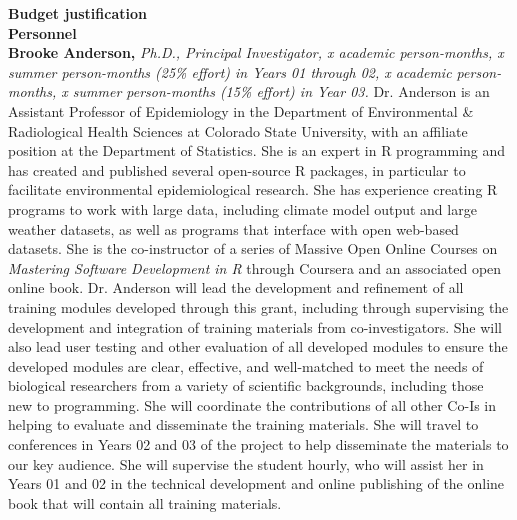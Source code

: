 \documentclass[pdftex,english,11pt,parskip=half]{scrartcl}
\begin{document}
\def\bf{\normalfont\bfseries}
\pagestyle{empty}

\textbf{Budget justification} \ \\

{\large \textbf{Personnel}} \\

\noindent \textbf{Brooke Anderson,} \textit{Ph.D., Principal Investigator, x academic person-months, x summer person-months (25\% effort) in Years 01 through 02, x academic person-months, x summer person-months (15\% effort) in Year 03.} Dr. Anderson is an Assistant Professor of Epidemiology in the Department of Environmental \& Radiological Health Sciences at Colorado State University, with an affiliate position at the Department of Statistics. She is an expert in R programming and has created and published several open-source R packages, in particular to facilitate environmental epidemiological research. She has experience creating R programs to work with large data, including climate model output and large weather datasets, as well as programs that interface with open web-based datasets. She is the co-instructor of a series of Massive Open Online Courses on \textit{Mastering Software Development in R} through Coursera and an associated open online book. Dr. Anderson will lead the development and refinement of all training modules developed through this grant, including through supervising the development and integration of training materials from co-investigators. She will also lead user testing and other evaluation of all developed modules to ensure the developed modules are clear, effective, and well-matched to meet the needs of biological researchers from a variety of scientific backgrounds, including those new to programming. She will coordinate the contributions of all other Co-Is in helping to evaluate and disseminate the training materials. She will travel to conferences in Years 02 and 03 of the project to help disseminate the materials to our key audience. She will supervise the student hourly, who will assist her in Years 01 and 02 in the technical development and online publishing of the online book that will contain all training materials. 
\end{document}
